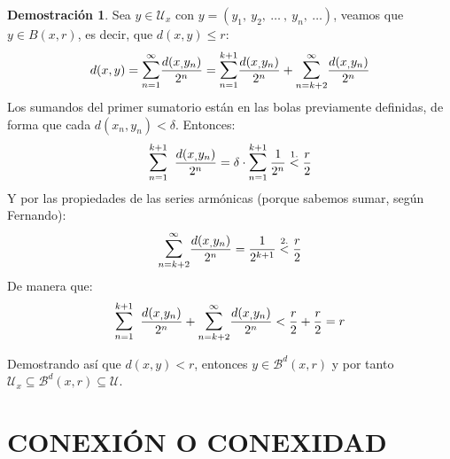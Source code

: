 \documentclass[12pt,twoside]{report}
\newcommand\mc[1]{\mathcal{#1}}
\theoremstyle{azul}
\theoremstyle{azul2}
\theoremstyle{plain}
\theoremstyle{definition}
\newtheorem*{dem}{Demostración}
\theoremstyle{remark}
\begin{document}
\begin{dem}
Sea $y \in \mc{U}_x$ con $y=(y_1, \: y_2, \: \ldots \:, \: y_n, \: \ldots)$, veamos que $y \in B(x,r)$, es decir, que $d(x,y) \leq r$:
$$d(x,y) = \mathlarger{\sum}_{n=1}^{\infty} \dfrac{d(x_, y_n)}{2^n} = \mathlarger{\sum}_{n=1}^{k+1} \dfrac{d(x_, y_n)}{2^n} + \mathlarger{\sum}_{n=k+2}^{\infty} \dfrac{d(x_, y_n)}{2^n}$$
Los sumandos del primer sumatorio están en las bolas previamente definidas, de forma que cada $d(x_n, y_n) < \delta$. Entonces:
$$\mathlarger{\sum}_{n=1}^{k+1} \; \; \dfrac{d(x_, y_n)}{2^n} = \delta \cdot \mathlarger{\sum}_{n=1}^{k+1} \: \dfrac{1}{2^n} \stackrel{1.}{ < } \dfrac{r}{2}$$
Y por las propiedades de las series armónicas (porque sabemos sumar, según Fernando):
$$\mathlarger{\sum}_{n=k+2}^{\infty} \dfrac{d(x_, y_n)}{2^n} = \dfrac{1}{2^{k+1}} \stackrel{2.}{ < } \dfrac{r}{2}$$
De manera que:
$$\mathlarger{\sum}_{n=1}^{k+1} \; \; \dfrac{d(x_, y_n)}{2^n} + \mathlarger{\sum}_{n=k+2}^{\infty} \dfrac{d(x_, y_n)}{2^n} < \dfrac{r}{2} + \dfrac{r}{2} = r$$

Demostrando así que $d(x,y) < r$, entonces $y \in \mc{B}^d(x,r)$ y por tanto $\mc{U}_x \subseteq \mc{B}^d(x,r) \subseteq \mc{U}$. 
\end{dem}


\chapter{CONEXIÓN O CONEXIDAD}
\end{document}
